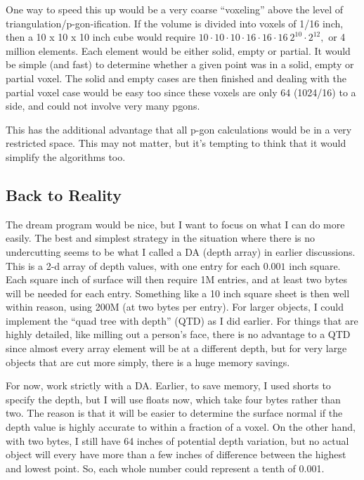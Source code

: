 \documentclass[titlepage,oneside,10pt]{article}
\begin{document}
One way to speed this up would be a very coarse ``voxeling'' above the
level of triangulation/p-gon-ification. If the volume is divided into
voxels of 1/16 inch, then a 10 x 10 x 10 inch cube would require
$10\cdot10\cdot10\cdot 16\cdot16\cdot16 ~ 2^{10}\cdot2^{12},$ or 4 million
elements. Each element would be either solid, empty or partial. It
would be simple (and fast) to determine whether a given point was in a
solid, empty or partial voxel. The solid and empty cases are then
finished and dealing with the partial voxel case would be easy too
since these voxels are only 64 (1024/16) to a side, and could not
involve very many pgons.

This has the additional advantage that all p-gon calculations would be
in a very restricted space. This may not matter, but it's tempting to
think that it would simplify the algorithms too.

\subsection{Back to Reality}

The dream program would be nice, but I want to focus on what I can do
more easily. The best and simplest strategy in the situation where
there is no undercutting seems to be what I called a DA (depth array)
in earlier discussions. This is a 2-d array of depth values, with one
entry for each $0.001$ inch square. Each square inch of surface will
then require 1M entries, and at least two bytes will be needed for
each entry. Something like a 10 inch square sheet is then well within
reason, using 200M (at two bytes per entry). For larger objects, I
could implement the ``quad tree with depth'' (QTD) as I did
earlier. For things that are highly detailed, like milling out a
person's face, there is no advantage to a QTD since almost every array
element will be at a different depth, but for very large objects that
are cut more simply, there is a huge memory savings.

For now, work strictly with a DA. Earlier, to save memory, I used
shorts to specify the depth, but I will use floats now, which take
four bytes rather than two. The reason is that it will be easier to
determine the surface normal if the depth value is highly accurate to
within a fraction of a voxel. On the other hand, with two bytes, I
still have 64 inches of potential depth variation, but no actual
object will every have more than a few inches of difference between
the highest and lowest point. So, each whole number could represent a
tenth of 0.001.
\end{document}
